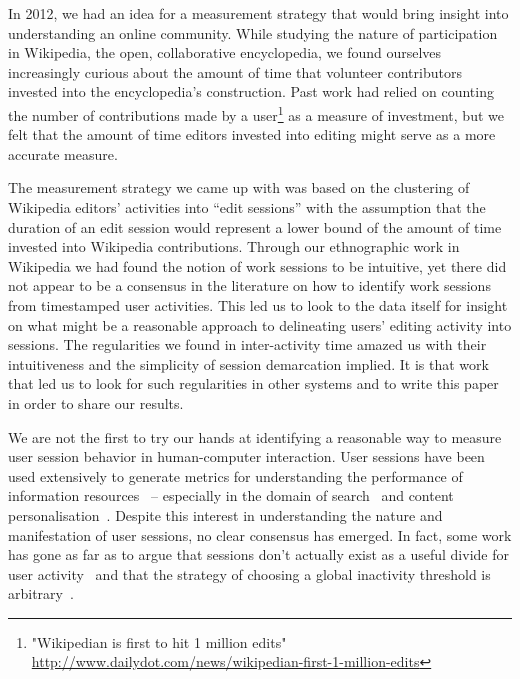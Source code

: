 In 2012, we had an idea for a measurement strategy that would bring insight into understanding an online community.  While studying the nature of participation in Wikipedia, the open, collaborative encyclopedia, we found ourselves increasingly curious about the amount of time that volunteer contributors invested into the encyclopedia's construction.  Past work had relied on counting the number of contributions made by a user\footnote{"Wikipedian is first to hit 1 million edits" \url{http://www.dailydot.com/news/wikipedian-first-1-million-edits}} as a measure of investment, but we felt that the amount of time editors invested into editing might serve as a more accurate measure.

The measurement strategy we came up with was based on the clustering of Wikipedia editors' activities into ``edit sessions'' with the assumption that the duration of an edit session would represent a lower bound of the amount of time invested into Wikipedia contributions\cite{geiger2013using}.  Through our ethnographic work in Wikipedia we had found the notion of work sessions to be intuitive, yet there did not appear to be a consensus in the literature on how to identify work sessions from timestamped user activities.  This led us to look to the data itself for insight on what might be a reasonable approach to delineating users' editing activity into sessions. The regularities we found in inter-activity time amazed us with their intuitiveness and the simplicity of session demarcation implied. It is that work that led us to look for such regularities in other systems and to write this paper in order to share our results.

We are not the first to try our hands at identifying a reasonable way to measure user session behavior in human-computer interaction.  User sessions have been used extensively to generate metrics for understanding the performance of information resources~\cite{govseva2006empirical} -- especially in the domain of search~\cite{donato2010you,eickhoff2014lessons} and content personalisation~\cite{gomory1999analysis,spiliopoulou2003framework}. Despite this interest in understanding the nature and manifestation of user sessions, no clear consensus has emerged.  In fact, some work has gone as far as to argue that sessions don't actually exist as a useful divide for user activity~\cite{jones2008beyond} and that the strategy of choosing a global inactivity threshold is arbitrary~\cite{montgomery2001identifying}.

